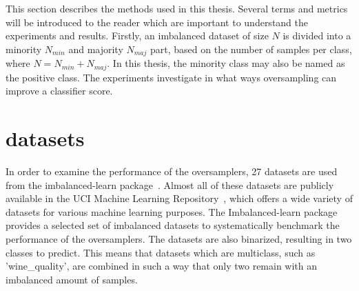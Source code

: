 
This section describes the methods used in this thesis. Several terms and metrics will be introduced to the reader which are important to understand the experiments and results. Firstly, an imbalanced dataset of size $N$ is divided into a minority $N_{min}$ and majority $N_{maj}$ part, based on the number of samples per class, where $N = N_{min} + N_{maj}$. In this thesis, the minority class may also be named as the positive class. The experiments investigate in what ways oversampling can improve a classifier score.  

\section{datasets}
In order to examine the performance of the oversamplers, 27 datasets are used from the imbalanced-learn package~\cite{Lemaitre2017Imbalanced-learn:Learning}. Almost all of these datasets are publicly available in the UCI Machine Learning Repository~\cite{Dua2017UCIRepository}, which offers a wide variety of datasets for various machine learning purposes. The Imbalanced-learn package provides a selected set of imbalanced datasets to systematically benchmark the performance of the oversamplers. The datasets are also binarized, resulting in two classes to predict. This means that datasets which are multiclass, such as 'wine\_quality', are combined in such a way that only two remain with an imbalanced amount of samples.

